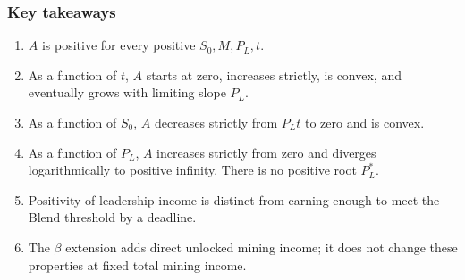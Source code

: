 \documentclass[11pt,a4paper]{article}
\begin{document}
\subsubsection{Key takeaways}
\begin{enumerate}
\item $A$ is positive for every positive $S_0,M,P_L,t$.
\item As a function of $t$, $A$ starts at zero, increases strictly, is convex, and eventually grows with limiting slope $P_L$.
\item As a function of $S_0$, $A$ decreases strictly from $P_Lt$ to zero and is convex.
\item As a function of $P_L$, $A$ increases strictly from zero and diverges logarithmically to positive infinity. There is no positive root $P_L^*$.
\item Positivity of leadership income is distinct from earning enough to meet the Blend threshold by a deadline.
\item The $\beta$ extension adds direct unlocked mining income; it does not change these properties at fixed total mining income.
\end{enumerate}
\end{document}
